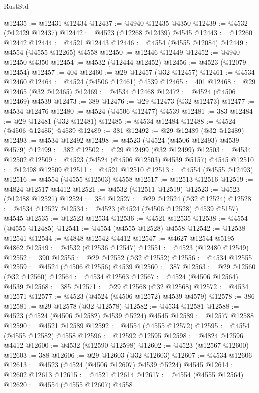 \begin{lexlean}{RustStd}
\begin{coremodule}
@12435 := @12431 @12434
@12437 := @4940 @12435 @4350
@12439 := @4532 (@12429 @12437)
@12442 := @4523 (@12268 @12439) @4545
@12443 := @12260 @12442
@12444 := @4521 @12443
@12446 := @4554 (@4555 @12084)
@12449 := @4554 (@4555 @12265) @4558
@12450 := @12446 @12449
@12452 := @4940 @12450 @4350
@12454 := @4532 (@12444 @12452)
@12456 := @4523 (@12079 @12454)
@12457 := 404
@12460 := @29 @12457 (@32 @12457)
@12461 := @4534 @12460
@12464 := @4524 (@4506 @12461) @4539
@12465 := 401
@12468 := @29 @12465 (@32 @12465)
@12469 := @4534 @12468
@12472 := @4524 (@4506 @12469) @4539
@12473 := 389
@12476 := @29 @12473 (@32 @12473)
@12477 := @4534 @12476
@12480 := @4524 (@4506 @12477) @4539
@12481 := 383
@12484 := @29 @12481 (@32 @12481)
@12485 := @4534 @12484
@12488 := @4524 (@4506 @12485) @4539
@12489 := 381
@12492 := @29 @12489 (@32 @12489)
@12493 := @4534 @12492
@12498 := @4523 (@4524 (@4506 @12493) @4539 @4579)
@12499 := 382
@12502 := @29 @12499 (@32 @12499)
@12503 := @4534 @12502
@12509 := @4523 (@4524 (@4506 @12503) @4539 @5157) @4545
@12510 := @12498 @12509
@12511 := @4521 @12510
@12513 := @4554 (@4555 @12493)
@12516 := @4554 (@4555 @12503) @4558
@12517 := @12513 @12516
@12519 := @4824 @12517 @4412
@12521 := @4532 (@12511 @12519)
@12523 := @4523 (@12488 @12521)
@12524 := 384
@12527 := @29 @12524 (@32 @12524)
@12528 := @4534 @12527
@12534 := @4523 (@4524 (@4506 @12528) @4539 @5157) @4545
@12535 := @12523 @12534
@12536 := @4521 @12535
@12538 := @4554 (@4555 @12485)
@12541 := @4554 (@4555 @12528) @4558
@12542 := @12538 @12541
@12544 := @4848 @12542 @4412
@12547 := @4627 @12544 @5195 @4862
@12549 := @4532 (@12536 @12547)
@12551 := @4523 (@12480 @12549)
@12552 := 390
@12555 := @29 @12552 (@32 @12552)
@12556 := @4534 @12555
@12559 := @4524 (@4506 @12556) @4539
@12560 := 387
@12563 := @29 @12560 (@32 @12560)
@12564 := @4534 @12563
@12567 := @4524 (@4506 @12564) @4539
@12568 := 385
@12571 := @29 @12568 (@32 @12568)
@12572 := @4534 @12571
@12577 := @4523 (@4524 (@4506 @12572) @4539 @4579)
@12578 := 386
@12581 := @29 @12578 (@32 @12578)
@12582 := @4534 @12581
@12588 := @4523 (@4524 (@4506 @12582) @4539 @5224) @4545
@12589 := @12577 @12588
@12590 := @4521 @12589
@12592 := @4554 (@4555 @12572)
@12595 := @4554 (@4555 @12582) @4558
@12596 := @12592 @12595
@12598 := @4824 @12596 @4412
@12600 := @4532 (@12590 @12598)
@12602 := @4523 (@12567 @12600)
@12603 := 388
@12606 := @29 @12603 (@32 @12603)
@12607 := @4534 @12606
@12613 := @4523 (@4524 (@4506 @12607) @4539 @5224) @4545
@12614 := @12602 @12613
@12615 := @4521 @12614
@12617 := @4554 (@4555 @12564)
@12620 := @4554 (@4555 @12607) @4558

\end{coremodule}
\end{lexlean}
